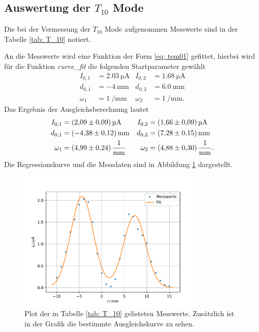 \subsection{Auswertung der $T_{10}$ Mode}
\FloatBarrier
Die bei der Vermessung der $T_{10}$ Mode aufgenommen Messwerte sind in der Tabelle
\ref{tab: T_10} notiert.

An die Messwerte wird eine Funktion der Form \eqref{eq: tem01} gefittet, hierbei wird für %
die Funktion \emph{curve\_fit} die folgenden Startparameter gewählt
\begin{align*}
  I_{0,1}&=\SI{2.03}{\micro\ampere} & I_{0,2}&=\SI{1.68}{\micro\ampere}\\       %
  d_{0,1}&=\SI{-4}{\milli\meter}& d_{0,2}&=\SI{6.0}{\milli\meter} \\
  \omega_1&=\SI{1}{\per\milli\meter} &   \omega_2&=\SI{1}{\per\milli\meter}.
\end{align*}
Das Ergebnis der Ausgleichsberechnung lautet
\begin{align}
  \label{eq: fit_t_10}
  \begin{aligned}
  I_{0,1}&=\SI{2.09\pm0.09}{\micro\ampere} & I_{0,2}&=\SI{1.66\pm0.09}{\micro\ampere}\\   %
  d_{0,1}&=\SI{-4.38\pm0.12}{\milli\meter}& d_{0,2}&=\SI{7.28\pm0.15}{\milli\meter} \\
  \omega_1&=\SI{4.99\pm0.24}{\per\milli\meter} &   \omega_2&=\SI{4.88\pm0.30}{\per\milli\meter}.
\end{aligned}
\end{align}
Die Regressionskurve und die Messdaten sind in Abbildung \ref{fig: T_10} dargestellt.
\begin{figure}[h!]
  \centering
  \includegraphics[width=0.8\textwidth]{../Messdaten/plots/T_10.pdf}
  \caption{Plot der in Tabelle \ref{tab: T_10} gelisteten Messwerte. Zusätzlich ist in der Grafik die bestimmte Ausgleichskurve zu sehen.}
  \label{fig: T_10}
\end{figure}
\FloatBarrier
